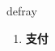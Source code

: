 
\begin{frame}
{\huge defray}
\begin{center}
\begin{enumerate}\Large
  \item \textbf{支付}
\end{enumerate}
\end{center}
\end{frame}

